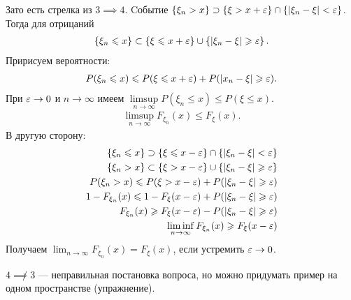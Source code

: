 \documentclass[../main.tex]{subfiles}
\begin{document}
Зато есть стрелка из $ 3 \implies 4 $. Cобытие $ \left\{ \xi_n > x \right\} \supset \left\{ \xi > x + \varepsilon \right\} \cap \left\{ \left| \xi_n - \xi \right| < \varepsilon \right\}$. Тогда для отрицаний
\begin{align*}
 \left\{ \xi_n \leqslant x \right\} \subset \left\{ \xi \leqslant x + \varepsilon \right\} \cup \left\{ \left| \xi_n - \xi \right| \geqslant \varepsilon \right\}.
\end{align*} Пририсуем вероятности:
\begin{align*}
 P(\xi_n \leqslant x) \leqslant P(\xi \leqslant x + \varepsilon) + P(\left| x_n - \xi \right| \geqslant \varepsilon).
\end{align*} При $ \varepsilon \to 0 $ и $ n \to \infty $ имеем $ \limsup\limits_{n \to \infty} P(\xi_n \leqslant x) \leqslant P(\xi \leqslant x)   $.
\begin{align*}
 \limsup\limits_{n \to \infty} F_{\xi_n} (x) \leqslant F_{\xi}(x)
.\end{align*} В другую сторону:
\begin{align*}
 \left\{ \xi_n \leqslant x \right\} \supset \left\{ \xi \leqslant x - \varepsilon \right\} \cap \left\{ \left| \xi_n - \xi \right| < \varepsilon \right\} \\
 \left\{ \xi_n > x \right\} \subset \left\{ \xi > x - \varepsilon \right\} \cup \left\{ \left| \xi_n-\xi \right| \geqslant \varepsilon \right\} \\
 P(\xi_n > x) \leqslant P(\xi > x - \varepsilon) + P(\left| \xi_n - \xi \right| \geqslant \varepsilon) \\
 1 - F_{\xi_n}(x) \leqslant 1 - F_{\xi}(x - \varepsilon) + P(\left| \xi_n - \xi \right| \geqslant \varepsilon) \\
 F_{\xi_n}(x) \geqslant F_\xi(x - \varepsilon) - P(\left|  \xi_n - \xi \right| \geqslant \varepsilon) \\
 \liminf_{n \to \infty} F_{\xi_n}(x) \geqslant F_{\xi}(x - \varepsilon)
\end{align*} Получаем $ \lim_{n \to \infty} F_{\xi_n}(x) = F_{\xi}(x) $, если устремить $ \varepsilon \to 0 $.

$ 4 \not \implies 3 $ --- неправильная постановка вопроса, но можно придумать пример на одном пространстве (упражнение).
\end{document}
